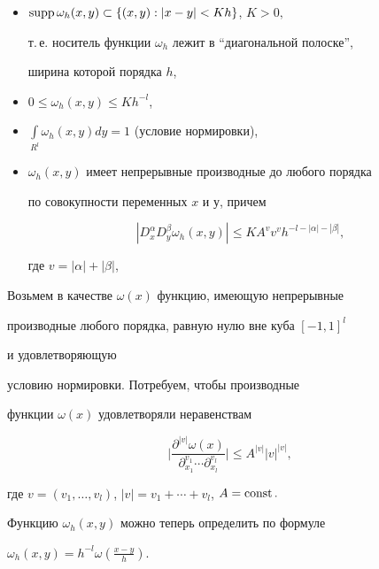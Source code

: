 \begin{itemize}


\item[1)] $\supp\omega_h(x,y)\subset \{(x,y):


|x-y|< Kh\}$, $K>0,$


т.\,е. носитель функции $\omega_h $ лежит в ``диагональной полоске'',


ширина которой порядка $h$,


\item[2)] $0\le \omega_h(x,y)\le Kh^{-l}$,


\item[3)] $\int\limits_{R^l}\omega_h(x,y) dy=1$ (условие нормировки),


\item[4)] $\omega_h(x,y) $ имеет непрерывные производные до любого порядка


по совокупности переменных $x$ и $у$, причем


$$


|D_x^\alpha D_y^\beta\omega_h(x,y)


|\le KA^vv^vh^{-l-|\alpha|-|\beta|},


$$


где $v=| \alpha |+| \beta |$,


\end{itemize}





Возьмем в качестве $\omega(x)$ функцию, имеющую непрерывные


производные любого порядка, равную нулю вне куба $[-1,1]^l$


и удовлетворяющую


условию нормировки. Потребуем, чтобы производные


функции $\omega(x) $ удовлетворяли неравенствам


$$


\bigg|\frac{\partial^{| v|}\omega (x)}{\partial^


{v_1}_{x_1}\dotsb\partial^{v_l}_{x_l}}\bigg|\le


A^{| v|}| v|^{| v|},


$$


где $v=(v_1,\dotsc,v_l)$, $| v|=v_1+\dotsb+ v_l$, $A=\operatorname{const}.$





Функцию $\omega_h(x,y)$ можно теперь определить по формуле


$\omega_h(x,y)=h^{-l}\omega(\frac{x-y}{h})$.





